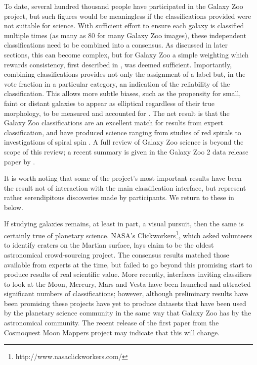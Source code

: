 \documentclass{ar2e}
\begin{document}
To date, several hundred thousand people 
have participated in the Galaxy Zoo project, but such
figures would be meaningless if the classifications provided were not suitable
for science. With sufficient effort to ensure each galaxy is classified multiple
times (as many as 80 for many Galaxy Zoo images), these independent
classifications need to be combined into a consensus. As discussed in later
sections, this can become complex, but for Galaxy Zoo a simple weighting which
rewards consistency, first described in \citet{Land++2008}, was deemed sufficient.
Importantly, combining classifications provides not only the assignment of a
label but, in the vote fraction in a particular category, an indication of the
reliability of the classification. This allows more subtle biases, such as the
propensity for small, faint or distant galaxies to appear as elliptical
regardless of their true morphology, to be measured and accounted for
\citep[see][]{Bamford++2009}. The net result is that the Galaxy Zoo classifications
are an excellent match for results from expert classification, and have produced
science ranging from studies of red spirals \citep{Masters++2010} to investigations
of spiral spin \citep{Slosar++2009}.
A full review of Galaxy Zoo science is beyond the scope of this review; a recent
summary is given in the Galaxy Zoo 2 data release paper by \citet{Willett++2013}.

It is worth noting that some of the project's most important results
have been the result not of interaction with the main classification interface,
but represent rather serendipitous discoveries made by participants. 
We return to these in  below.




If studying galaxies remains, at least in part, a visual pursuit, then the same
is certainly true of planetary science. NASA's Clickworkers\footnote{http://www.nasaclickworkers.com/}, which asked
volunteers to identify craters on the Martian surface, lays claim to be the
oldest astronomical crowd-sourcing project. The consensus results matched those
available from experts at the time, but failed to go beyond this promising start
to produce results of real scientific value. More recently, interfaces inviting
classifiers to look at the Moon, Mercury, Mars and Vesta have been launched and
attracted significant numbers of classifications; however, although preliminary
results have been promising\citep{Kanefsky} these projects have yet to produce datasets that
have been used by the planetary science community in the same way that Galaxy
Zoo has by the astronomical community. The recent release of the first paper from the Cosmoquest
Moon Mappers project \citep{Robbins} may indicate that this will change. 
\end{document}
